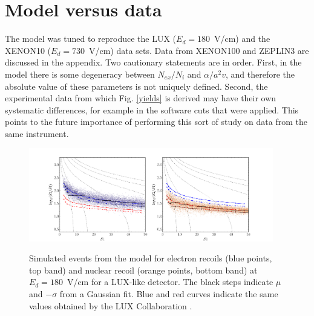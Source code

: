 \documentclass[article]{revtex4-1}[11pt]
\begin{document}
\section{Model versus data}
The model was tuned to reproduce the LUX ($E_d=180$~V/cm) and the XENON10 ($E_d=730$~V/cm) data sets. Data from XENON100 and ZEPLIN3 are discussed in the appendix. Two cautionary statements are in order. First, in the model there is some degeneracy between $N_{ex}/N_i$ and $\alpha/a^2v$, and therefore the absolute value of these parameters is not uniquely defined. Second, the experimental data from which Fig. \ref{yields} is derived may have their own systematic differences, for example in the software cuts that were applied. This points to the future importance of performing this sort of study on data from the same instrument.

\begin{figure}[h]
\begin{center}
\vskip -0.0cm
\includegraphics[width=0.95\textwidth]{figs/bands_LUX.pdf}
\vskip -0.1cm
\caption{Simulated events from the model for electron recoils (blue points, top band) and nuclear recoil (orange points, bottom band) at $E_d=180$~V/cm for a LUX-like detector. The black steps indicate $\mu$ and $-\sigma$ from a Gaussian fit. Blue and red curves indicate the same values obtained by the LUX Collaboration \cite{}.  }
\vskip -0.5cm
\label{bands_LUX}
\end{center}
\end{figure} 
\end{document}
